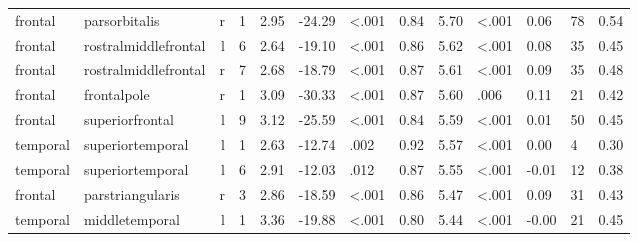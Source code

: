 \documentclass{article}
\begin{document}
\begin{longtable}{llrR{1.3cm}R{1cm}R{1.3cm}R{1cm}R{1cm}R{1.3cm}R{1cm}R{1.8cm}R{1.3cm}R{1.8cm}}
   frontal &             parsorbitalis &    r &         1 &                  2.95 &           -24.29 &      \textless.001 &                               0.84 &                          5.70 &                   \textless.001 &   0.06 &     78 &      0.54 \\
   frontal &      rostralmiddlefrontal &    l &         6 &                  2.64 &           -19.10 &      \textless.001 &                               0.86 &                          5.62 &                   \textless.001 &   0.08 &     35 &      0.45 \\
   frontal &      rostralmiddlefrontal &    r &         7 &                  2.68 &           -18.79 &      \textless.001 &                               0.87 &                          5.61 &                   \textless.001 &   0.09 &     35 &      0.48 \\
   frontal &               frontalpole &    r &         1 &                  3.09 &           -30.33 &      \textless.001 &                               0.87 &                          5.60 &                            .006 &   0.11 &     21 &      0.42 \\
   frontal &           superiorfrontal &    l &         9 &                  3.12 &           -25.59 &      \textless.001 &                               0.84 &                          5.59 &                   \textless.001 &   0.01 &     50 &      0.45 \\
  temporal &          superiortemporal &    l &         1 &                  2.63 &           -12.74 &               .002 &                               0.92 &                          5.57 &                   \textless.001 &   0.00 &      4 &      0.30 \\
  temporal &          superiortemporal &    l &         6 &                  2.91 &           -12.03 &               .012 &                               0.87 &                          5.55 &                   \textless.001 &  -0.01 &     12 &      0.38 \\
   frontal &          parstriangularis &    r &         3 &                  2.86 &           -18.59 &      \textless.001 &                               0.86 &                          5.47 &                   \textless.001 &   0.09 &     31 &      0.43 \\
  temporal &            middletemporal &    l &         1 &                  3.36 &           -19.88 &      \textless.001 &                               0.80 &                          5.44 &                   \textless.001 &  -0.00 &     21 &      0.45 \\

\end{longtable}
\end{document}

